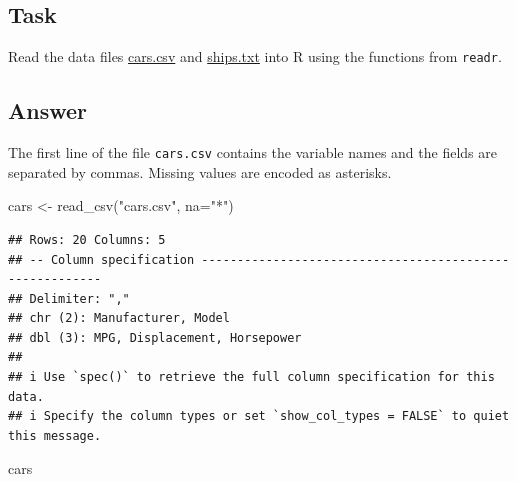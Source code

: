 \documentclass[
]{book}
\newenvironment{Shaded}{\begin{snugshade}}{\end{snugshade}}
\newcommand{\AttributeTok}[1]{\textcolor[rgb]{0.77,0.63,0.00}{#1}}
\newcommand{\FunctionTok}[1]{\textcolor[rgb]{0.00,0.00,0.00}{#1}}
\newcommand{\NormalTok}[1]{#1}
\newcommand{\OtherTok}[1]{\textcolor[rgb]{0.56,0.35,0.01}{#1}}
\newcommand{\StringTok}[1]{\textcolor[rgb]{0.31,0.60,0.02}{#1}}
\begin{document}
\hypertarget{task-2}{%
\subsection{Task}\label{task-2}}

Read the data files \href{https://github.com/UofGAnalyticsData/R/raw/main/Week\%203/cars.csv}{cars.csv} and \href{https://github.com/UofGAnalyticsData/R/raw/main/Week\%203/ships.txt}{ships.txt} into R using the functions from \texttt{readr}.

\hypertarget{answer-1}{%
\subsection{Answer}\label{answer-1}}

The first line of the file \texttt{cars.csv} contains the variable names and the fields are separated by commas. Missing values are encoded as asterisks.

\begin{Shaded}
\begin{Highlighting}[]
\NormalTok{cars }\OtherTok{\textless{}{-}} \FunctionTok{read\_csv}\NormalTok{(}\StringTok{"cars.csv"}\NormalTok{, }\AttributeTok{na=}\StringTok{"*"}\NormalTok{)}
\end{Highlighting}
\end{Shaded}

\begin{verbatim}
## Rows: 20 Columns: 5
## -- Column specification --------------------------------------------------------
## Delimiter: ","
## chr (2): Manufacturer, Model
## dbl (3): MPG, Displacement, Horsepower
## 
## i Use `spec()` to retrieve the full column specification for this data.
## i Specify the column types or set `show_col_types = FALSE` to quiet this message.
\end{verbatim}

\begin{Shaded}
\begin{Highlighting}[]
\NormalTok{cars}
\end{Highlighting}
\end{Shaded}
\end{document}
